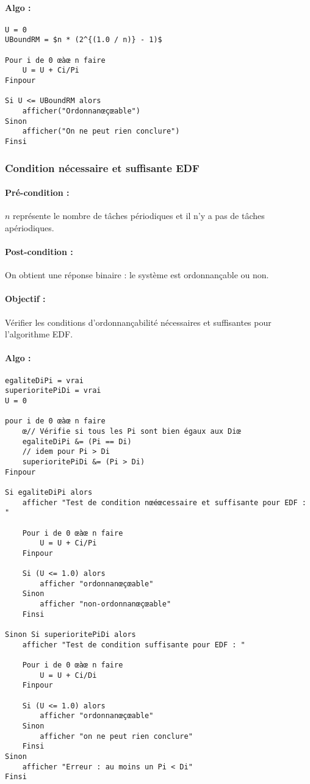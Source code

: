				\paragraph{Algo :} 
					\begin{lstlisting}[mathescape]
U = 0
UBoundRM = $n * (2^{(1.0 / n)} - 1)$
					
Pour i de 0 œàœ n faire
	U = U + Ci/Pi
Finpour

Si U <= UBoundRM alors
	afficher("Ordonnanœçœable")
Sinon
	afficher("On ne peut rien conclure")
Finsi
					\end{lstlisting}
			
			\subsubsection{Condition nécessaire et suffisante EDF}
				\paragraph{Pré-condition :} $n$ représente le nombre de tâches périodiques et il n'y a pas de tâches apériodiques.
				\paragraph{Post-condition :} On obtient une réponse binaire : le système est ordonnançable ou non.
				\paragraph{Objectif :} Vérifier les conditions d'ordonnançabilité nécessaires et suffisantes pour l'algorithme EDF.
				\paragraph{Algo :} 
					\begin{lstlisting}[mathescape]
egaliteDiPi = vrai					
superioritePiDi = vrai
U = 0		
			
pour i de 0 œàœ n faire
    œ// Vérifie si tous les Pi sont bien égaux aux Diœ
	egaliteDiPi &= (Pi == Di) 
	// idem pour Pi > Di
	superioritePiDi &= (Pi > Di) 
Finpour

Si egaliteDiPi alors
	afficher "Test de condition nœéœcessaire et suffisante pour EDF : "

    Pour i de 0 œàœ n faire
	    U = U + Ci/Pi
    Finpour
	
	Si (U <= 1.0) alors
		afficher "ordonnanœçœable"
	Sinon
		afficher "non-ordonnanœçœable"
	Finsi
	
Sinon Si superioritePiDi alors
	afficher "Test de condition suffisante pour EDF : "
    
    Pour i de 0 œàœ n faire
	    U = U + Ci/Di
    Finpour
	
	Si (U <= 1.0) alors
		afficher "ordonnanœçœable"
	Sinon
		afficher "on ne peut rien conclure"
	Finsi
Sinon
    afficher "Erreur : au moins un Pi < Di"
Finsi
					\end{lstlisting}
					
